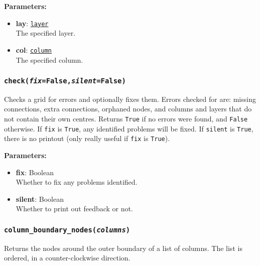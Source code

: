 \textbf{Parameters:}
\begin{itemize}
\item \textbf{lay}: \hyperref[layerobjects]{\texttt{layer}}\\
  The specified layer.
\item \textbf{col}: \hyperref[columnobjects]{\texttt{column}}\\
  The specified column.
\end{itemize}

\begin{snugshade}\subsubsection{\texttt{check(\emph{fix}=False,\emph{silent}=False)}}\end{snugshade}
\label{sec:mulgrid:check}

Checks a grid for errors and optionally fixes them.  Errors checked for are: missing connections, extra connections, orphaned nodes, and columns and layers that do not contain their own centres.  Returns \texttt{True} if no errors were found, and \texttt{False} otherwise.  If \texttt{fix} is \texttt{True}, any identified problems will be fixed.  If \texttt{silent} is \texttt{True}, there is no printout (only really useful if \texttt{fix} is \texttt{True}).

\textbf{Parameters:}
\begin{itemize}
\item \textbf{fix}: Boolean\\
  Whether to fix any problems identified.
\item \textbf{silent}: Boolean\\
  Whether to print out feedback or not.
\end{itemize}

\begin{snugshade}\subsubsection{\texttt{column\_boundary\_nodes(\emph{columns})}}\end{snugshade}
\label{sec:mulgrid:column_boundary_nodes}

Returns the nodes around the outer boundary of a list of columns.  The list is ordered, in a counter-clockwise direction.

